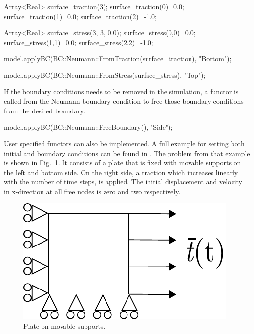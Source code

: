 \begin{cpp}
 
Array<Real> surface_traction(3);
surface_traction(0)=0.0;
surface_traction(1)=0.0;
surface_traction(2)=-1.0;

Array<Real> surface_stress(3, 3, 0.0);
surface_stress(0,0)=0.0;
surface_stress(1,1)=0.0;
surface_stress(2,2)=-1.0;

 model.applyBC(BC::Neumann::FromTraction(surface_traction), "Bottom");

 model.applyBC(BC::Neumann::FromStress(surface_stress), "Top");

\end{cpp}

If the boundary conditions needs to be removed in the simulation, a functor is called from the Neumann boundary condition to free those boundary conditions  from the desired boundary.

\begin{cpp}

model.applyBC(BC::Neumann::FreeBoundary(), "Side");

\end{cpp}


User specified functors can also be implemented.  A full example for setting both  initial and boundary conditions can be found in .  The problem from that example is shown in Fig.~\ref{fig:smm:bc_and_ic}. It consists of a plate that is fixed with
 movable supports  on the  left and bottom  side. On  the right side,  a traction
which increases linearly with the number  of time steps, is applied. The initial
displacement  and velocity  in x-direction  at all  free nodes  is zero  and two
respectively.
\begin{figure}[!htb]
  \centering
  \includegraphics[scale=0.8]{figures/bc_and_ic_example}
  \caption{Plate on movable supports.\label{fig:smm:bc_and_ic}}
\end{figure}


